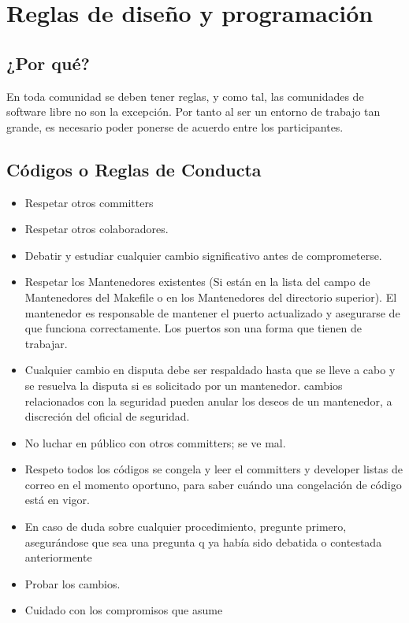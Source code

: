 \chapter{Reglas de diseño y programación}
\section{¿Por qué?}

{En toda comunidad se deben tener reglas, y como tal, las comunidades de software libre no son la excepción. Por tanto al ser un entorno de trabajo tan grande, es necesario poder ponerse de acuerdo entre los participantes.}

\section{Códigos o Reglas de Conducta}

\begin{itemize}
\item Respetar otros committers
\item Respetar otros colaboradores.
\item Debatir y estudiar cualquier cambio significativo antes de comprometerse.
\item Respetar los Mantenedores existentes (Si están en la lista del campo de Mantenedores del Makefile o en los Mantenedores del directorio superior).
El mantenedor es responsable de mantener el puerto actualizado y asegurarse de que funciona correctamente. Los puertos son una forma que tienen de trabajar.
\item Cualquier cambio en disputa debe ser respaldado hasta que se lleve a cabo y se resuelva la disputa si es solicitado por un mantenedor. cambios relacionados con la seguridad pueden anular los deseos de un mantenedor, a discreción del oficial de seguridad.
\item No luchar en público con otros committers; se ve mal.
\item Respeto todos los códigos se congela y leer el committers y developer listas de correo en el momento oportuno, para saber cuándo una congelación de código está en vigor.
\item En caso de duda sobre cualquier procedimiento, pregunte primero, asegurándose que sea una pregunta q ya había sido debatida o contestada anteriormente
\item Probar los cambios.
\item Cuidado con los compromisos que asume
\end{itemize}

